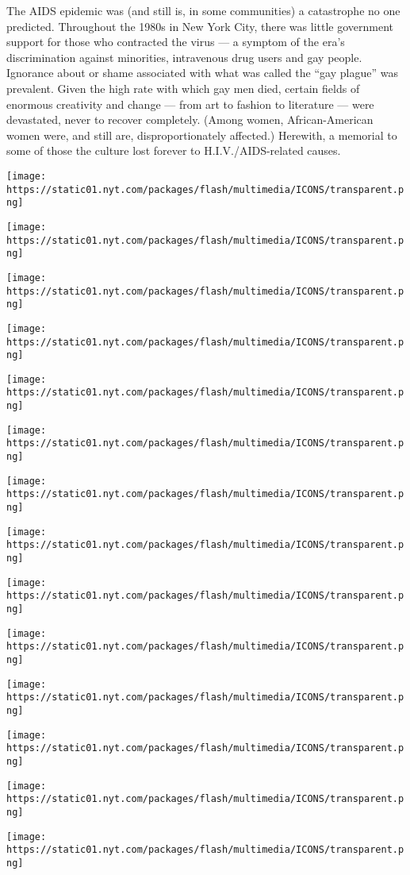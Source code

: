 The AIDS epidemic was (and still is, in some communities) a catastrophe
no one predicted. Throughout the 1980s in New York City, there was
little government support for those who contracted the virus --- a
symptom of the era's discrimination against minorities, intravenous drug
users and gay people. Ignorance about or shame associated with what was
called the ``gay plague'' was prevalent. Given the high rate with which
gay men died, certain fields of enormous creativity and change --- from
art to fashion to literature --- were devastated, never to recover
completely. (Among women, African-American women were, and still are,
disproportionately affected.) Herewith, a memorial to some of those the
culture lost forever to H.I.V./AIDS-related causes.

\texttt{[image: https://static01.nyt.com/packages/flash/multimedia/ICONS/transparent.png]}

\texttt{[image: https://static01.nyt.com/packages/flash/multimedia/ICONS/transparent.png]}

\texttt{[image: https://static01.nyt.com/packages/flash/multimedia/ICONS/transparent.png]}

\texttt{[image: https://static01.nyt.com/packages/flash/multimedia/ICONS/transparent.png]}

\texttt{[image: https://static01.nyt.com/packages/flash/multimedia/ICONS/transparent.png]}

\texttt{[image: https://static01.nyt.com/packages/flash/multimedia/ICONS/transparent.png]}

\texttt{[image: https://static01.nyt.com/packages/flash/multimedia/ICONS/transparent.png]}

\texttt{[image: https://static01.nyt.com/packages/flash/multimedia/ICONS/transparent.png]}

\texttt{[image: https://static01.nyt.com/packages/flash/multimedia/ICONS/transparent.png]}

\texttt{[image: https://static01.nyt.com/packages/flash/multimedia/ICONS/transparent.png]}

\texttt{[image: https://static01.nyt.com/packages/flash/multimedia/ICONS/transparent.png]}

\texttt{[image: https://static01.nyt.com/packages/flash/multimedia/ICONS/transparent.png]}

\texttt{[image: https://static01.nyt.com/packages/flash/multimedia/ICONS/transparent.png]}

\texttt{[image: https://static01.nyt.com/packages/flash/multimedia/ICONS/transparent.png]}

